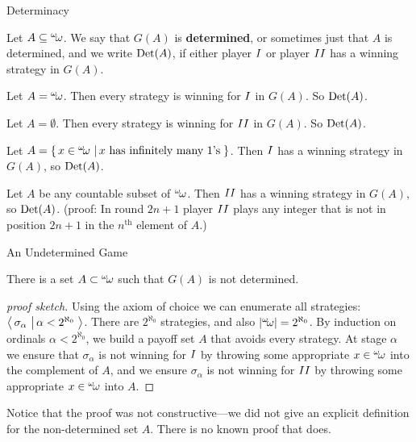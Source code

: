 \documentclass[pdf,final]{prosper}
\newcommand{\skipsmall}{\vspace{1em}}
\begin{document}
\begin{slide}{Determinacy}
\begin{definition}
Let $A\subseteq{}^{\omega}\!{\omega}$. We say that $G(A)$ is \textbf{determined}, or
sometimes just that $A$ is determined, and we
write $\operatorname{Det}(A)$, if either player $I$ or player $II$ has a winning strategy
in $G(A)$.
\end{definition}

\skipsmall

\begin{example}
Let $A={}^{\omega}\!{\omega}$. Then every strategy is winning for $I$ in $G(A)$. So $\operatorname{Det}(A)$.


\skipsmall

Let $A=\emptyset$. Then every strategy is winning for $II$ in $G(A)$. So
$\operatorname{Det}(A)$.


\skipsmall

Let $A=\left\{ \, x\in{}^{\omega}\!{\omega} \, \left| \, x\text{ has infinitely many 1's} \, \right.\right\}$. Then $I$
has a winning strategy in $G(A)$, so $\operatorname{Det}(A)$.


\skipsmall

Let $A$ be any countable subset of ${}^{\omega}\!{\omega}$. Then $II$ has a winning
strategy in $G(A)$, so $\operatorname{Det}(A)$. (proof: In round $2n+1$ player $II$ plays any
integer that is not in position $2n+1$ in the $n^{\text{th}}$ element of $A$.)
\end{example}

\end{slide}

\begin{slide}{An Undetermined Game}

\begin{theorem}
There is a set $A\subset{}^{\omega}\!{\omega}$ such that $G(A)$ is not determined.
\end{theorem}

\begin{proof}[proof sketch]
Using the axiom of choice we can enumerate all strategies: $\left\langle \, \sigma_{\alpha} \,\left| \, \alpha<2^{\aleph_0} \, \right. \right\rangle$.
There are $2^{\aleph_0}$ strategies, and also $|{}^{\omega}\!{\omega}|=2^{\aleph_0}$.
By induction on ordinals
$\alpha<2^{\aleph_0}$, we build a payoff set $A$ that avoids every strategy. At
stage $\alpha$ we ensure that $\sigma_{\alpha}$ is not winning for $I$ by
throwing some appropriate $x\in{}^{\omega}\!{\omega}$ into the complement of $A$, and we
ensure $\sigma_{\alpha}$ is not winning for $II$ by
throwing some appropriate $x\in{}^{\omega}\!{\omega}$ into $A$.
\end{proof}

\skipsmall

Notice that the proof was not constructive---we did not give an explicit
definition for the non-determined set $A$.  There is no known proof that does.

\end{slide}
\end{document}
